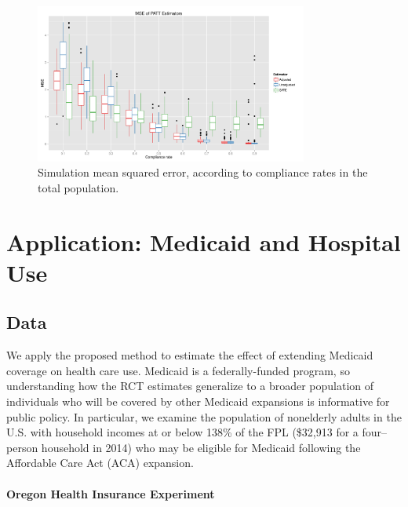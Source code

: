 \documentclass[12pt]{article}
\begin{document}
\begin{figure}[htbp]
\begin{center}
\includegraphics[width = 0.8\textwidth]{mse_boxplots_B5}
\caption{Simulation mean squared error, according to compliance rates in the total population.}
\label{fig:sim_compliance}
\end{center}
\end{figure}





\section{Application: Medicaid and Hospital Use}
\subsection{Data} \label{data}

We apply the proposed method to estimate the effect of extending Medicaid coverage on health care use.  Medicaid is a federally-funded program, so understanding how the RCT estimates generalize to a broader population of individuals who will be covered by other Medicaid expansions is informative for public policy. In particular, we examine the population of nonelderly adults in the U.S. with household incomes at or below 138\% of the FPL (\$32,913 for a four--person household in 2014) who may be eligible for Medicaid following the Affordable Care Act (ACA) expansion.

\paragraph{Oregon Health Insurance Experiment}
\end{document}
